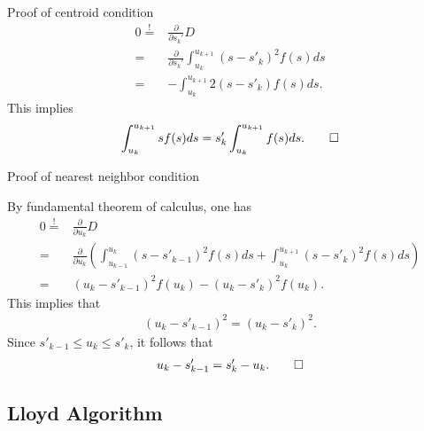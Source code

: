 \begin{frame}{Proof of centroid condition}
\begin{align*}
0\stackrel{!}{=}&\frac{\partial}{\partial s_k'}D\\=&\frac{\partial}{\partial s_k'}\int_{u_k}^{u_{k+1}}(s-s'_k)^2f(s)ds\\
=&-\int_{u_k}^{u_{k+1}}2(s-s'_k)f(s)ds.
\end{align*}
This implies
\begin{align*}
\int_{u_k}^{u_{k+1}}sf(s)ds=s'_k\int_{u_k}^{u_{k+1}}f(s)ds. \qed
\end{align*} 
\end{frame}
\begin{frame}{Proof of nearest neighbor condition} 

By fundamental theorem of calculus, one has 
\begin{align*}
0 \stackrel{!}{=}  &\frac{\partial}{\partial u_k}D\\=&\frac{\partial}{\partial u_k}\left(\int_{u_{k-1}}^{u_{k}}(s-s'_{k-1})^2f(s)ds+\int_{u_k}^{u_{k+1}}(s-s'_k)^2f(s)ds\right)\\
=&(u_k-s'_{k-1})^2f(u_k)-(u_k-s'_{k})^2f(u_k).
\end{align*}
This implies that
\begin{align*}
(u_k-s'_{k-1})^2=(u_k-s'_{k})^2.
\end{align*}
Since $s'_{k-1}\leq u_k\leq s'_k$, it follows that
\begin{align*}
u_k-s'_{k-1}=s'_k-u_k. \qed
\end{align*}
\end{frame}

\subsection{Lloyd Algorithm}

















